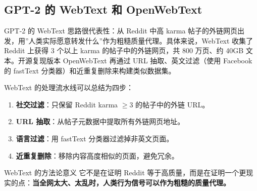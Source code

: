\subsection{GPT-2 的 WebText 和 OpenWebText}

GPT-2 的 WebText 思路很代表性：从 Reddit 中高 karma 帖子的外链网页出发，用”人类实际愿意转发什么”作为粗糙质量代理。具体来说，WebText 收集了 Reddit 上获得 3 个以上 karma 的帖子中的外链网页，共 800 万页、约 40GB 文本。开源复现版本 OpenWebText 再通过 URL 抽取、英文过滤（使用 Facebook 的 fastText 分类器）和近重复删除来构建类似数据集。

WebText 的处理流水线可以总结为四步：
\begin{enumerate}
    \item \textbf{社交过滤}：只保留 Reddit karma $\geq 3$ 的帖子中的外链 URL。
    \item \textbf{URL 抽取}：从帖子元数据中提取所有外链网页地址。
    \item \textbf{语言过滤}：用 fastText 分类器过滤掉非英文页面。
    \item \textbf{近重复删除}：移除内容高度相似的页面，避免冗余。
\end{enumerate}

\begin{importantbox}{WebText 的方法论意义}
它不是在证明 Reddit 等于高质量，而是在证明一个更现实的点：\textbf{当全网太大、太乱时，人类行为信号可以作为粗糙的质量代理。}
\end{importantbox}

